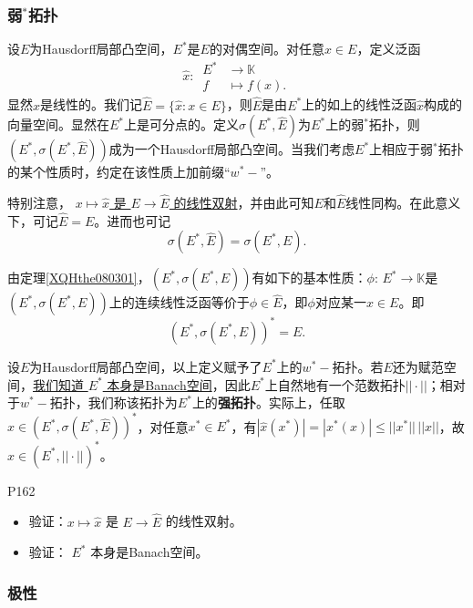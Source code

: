\subsubsection{弱$\!\!^{*}\!\!$拓扑}
\original
{设$E$为Hausdorff局部凸空间，$E^{*}$是$E$的对偶空间。对任意$x\in E$，定义泛函
\begin{equation*}
	\hat{x}:\,
	\begin{aligned}
	E^{*}&\rightarrow \mathbb{K}\\
	f&\mapsto f(x).
	\end{aligned}
\end{equation*}
显然$\hat{x}$是线性的。我们记$\hat{E}=\{\hat{x}:x\in E\}$，则$\hat{E}$是由$E^{*}$上的如上的线性泛函$\hat{x}$构成的向量空间。显然在$E^{*}$上是可分点的。定义$\sigma(E^{*},\hat{E})$为$E^{*}$上的弱$\!\!^{*}\!\!$拓扑，则$(E^{*},\sigma(E^{*},\hat{E}))$成为一个Hausdorff局部凸空间。当我们考虑$E^{*}$上相应于弱$\!\!^{*}\!\!$拓扑的某个性质时，约定在该性质上加前缀“$w^{*}-$”。
\par
特别注意， \uline{$x\mapsto\hat{x}$ 是 $E\rightarrow \hat{E}$ 的线性双射}，并由此可知$E$和$\hat{E}$线性同构。在此意义下，可记$\hat{E}=E$。进而也可记
\begin{equation*}
	\sigma(E^{*},\hat{E})=\sigma(E^{*},E).
\end{equation*}
\par
由定理\ref{XQHthe080301}，$(E^{*},\sigma(E^{*},E))$有如下的基本性质：$\phi:\,E^{*}\rightarrow\mathbb{K}$是$(E^{*},\sigma(E^{*},E))$上的连续线性泛函等价于$\phi\in \hat{E}$，即$\phi$对应某一$x\in E$。即
\begin{equation*}
	(E^{*},\sigma(E^{*},E))^{*}=E.
\end{equation*}
\par
设$E$为Hausdorff局部凸空间，以上定义赋予了$E^{*}$上的$w^{*}-$拓扑。若$E$还为赋范空间，\uline{我们知道 $E^{*}$ 本身是Banach空间}，因此$E^{*}$上自然地有一个范数拓扑$||\cdot||$；相对于$w^{*}-$拓扑，我们称该拓扑为$E^{*}$上的\textbf{强拓扑}。实际上，任取$\hat{x}\in (E^{*},\sigma(E^{*},\hat{E}))^{*}$，对任意$x^{*}\in E^{*}$，有$|\hat{x}(x^{*})|=|x^{*}(x)|\leq ||x^{*}||\,||x||$，故$\hat{x}\in (E^{*},||\cdot||)^{*}$。

}
{P162}

\begin{proposition}
	\begin{itemize}
		\item 验证：$x\mapsto\hat{x}$ 是 $E\rightarrow \hat{E}$ 的线性双射。
		\item 验证： $E^{*}$ 本身是Banach空间。
	\end{itemize}
\end{proposition}

\begin{example}[缓增广义函数]
	
\end{example}

\subsubsection{极性}



















